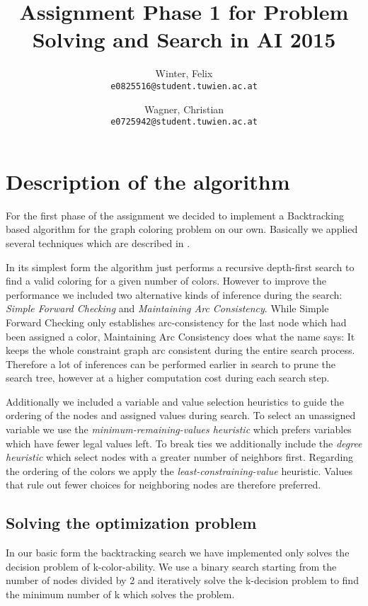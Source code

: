 \documentclass[a4paper]{scrartcl}
\author{
  Winter, Felix\\
  \texttt{e0825516@student.tuwien.ac.at}
  \and
  Wagner, Christian\\
  \texttt{e0725942@student.tuwien.ac.at}
}
\title{Assignment Phase 1 for Problem Solving and Search in AI 2015}
\begin{document}
\setlength{\abovedisplayskip}{0pt}
\setlength{\belowdisplayskip}{0pt}

\begingroup
 \makeatletter
 \maketitle
\endgroup

\section{Description of the algorithm}

For the first phase of the assignment we decided to implement a Backtracking based algorithm for the graph coloring problem on our own. Basically we applied several techniques which are described in \cite{Russell:2003:AIM:773294}.

In its simplest form the algorithm just performs a recursive depth-first search to find a valid coloring for a given number of colors. However to improve the performance we included two alternative kinds of inference during the search: \emph{Simple Forward Checking} and \emph{Maintaining Arc Consistency}. While Simple Forward Checking only establishes arc-consistency for the last node which had been assigned a color, Maintaining Arc Consistency does what the name says: It keeps the whole constraint graph arc consistent during the entire search process. Therefore a lot of inferences can be performed earlier in search to prune the search tree, however at a higher computation cost during each search step.

Additionally we included a variable and value selection heuristics to guide the ordering of the nodes and assigned values during search.
To select an unassigned variable we use the \emph{minimum-remaining-values heuristic} which prefers variables which have fewer legal values left. To break ties we additionally include the \emph{degree heuristic} which select nodes with a greater number of neighbors first.
Regarding the ordering of the colors we apply the \emph{least-constraining-value} heuristic. Values that rule out fewer choices for neighboring nodes are therefore preferred.

\subsection{Solving the optimization problem}

In our basic form the backtracking search we have implemented only solves the decision problem of k-color-ability. We use a binary search starting from the number of nodes divided by 2 and iteratively solve the k-decision problem to find the minimum number of k which solves the problem.
\end{document}
